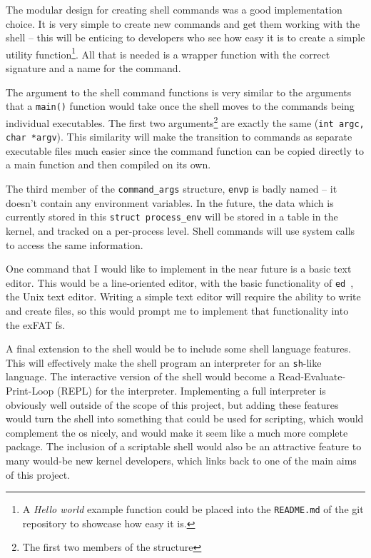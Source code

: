 \documentclass{article}
\begin{document}
The modular design for creating shell commands was a good implementation
choice. It is very simple to create new commands and get them working with the
shell -- this will be enticing to developers who see how easy it is to create a
simple utility function\footnote{A \emph{Hello world} example function could be
placed into the \texttt{README.md} of the git repository to showcase how easy
it is.}. All that is needed is a wrapper function with the correct signature
and a name for the command.

The argument to the shell command functions is very similar to the arguments
that a \texttt{main()} function would take once the shell moves to the commands
being individual executables. The first two arguments\footnote{The first two
members of the structure} are exactly the same (\verb!int argc, char *argv!).
This similarity will make the transition to commands as separate executable
files much easier since the command function can be copied directly to a main
function and then compiled on its own.

The third member of the \verb!command_args! structure, \verb!envp! is badly
named -- it doesn't contain any environment variables. In the future, the data
which is currently stored in this \verb!struct process_env! will be stored in a
table in the kernel, and tracked on a per-process level. Shell commands will
use system calls to access the same information.

One command that I would like to implement in the near future is a basic text
editor. This would be a line-oriented editor, with the basic functionality of
\texttt{ed}~\cite{ed}, the Unix text editor. Writing a simple text editor will
require the ability to write and create files, so this would prompt me to
implement that functionality into the exFAT \gls{fs}.

A final extension to the shell would be to include some shell language
features. This will effectively make the shell program an interpreter for an
\texttt{sh}-like language. The interactive version of the shell would become a
Read-Evaluate-Print-Loop (REPL) for the interpreter. Implementing a full
interpreter is obviously well outside of the scope of this project, but adding
these features would turn the shell into something that could be used for
scripting, which would complement the \gls{os} nicely, and would make it seem
like a much more complete package. The inclusion of a scriptable shell would
also be an attractive feature to many would-be new kernel developers, which
links back to one of the main aims of this project.
\end{document}
